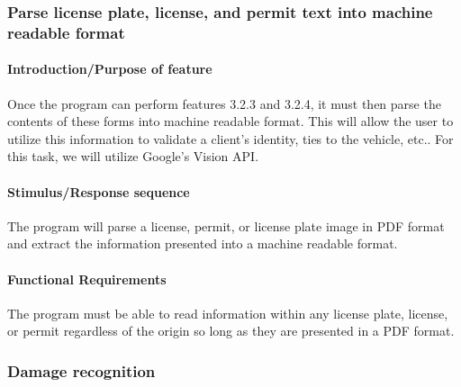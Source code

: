 \documentclass[onecolumn, draftclsnofoot,10pt, compsoc]{IEEEtran}
\begin{document}
\subsubsection{Parse license plate, license, and permit text into machine readable format}\vspace{.5cm}

\hfill\begin{minipage}{\dimexpr\textwidth-1cm}
\paragraph{Introduction/Purpose of feature}
Once the program can perform features 3.2.3 and 3.2.4, it must then parse the contents of these forms into machine readable format. This will allow the user to utilize this information to validate a client’s identity, ties to the vehicle, etc.. For this task, we will utilize Google’s Vision API.
\paragraph{Stimulus/Response sequence}
The program will parse a license, permit, or license plate image in PDF format and extract the information presented into a machine readable format. 
\paragraph{Functional Requirements}
The program must be able to read information within any license plate, license, or permit regardless of the origin so long as they are presented in a PDF format.  
\end{minipage}
\vspace{.75cm}

\subsubsection{Damage recognition}\vspace{.5cm}
\end{document}
